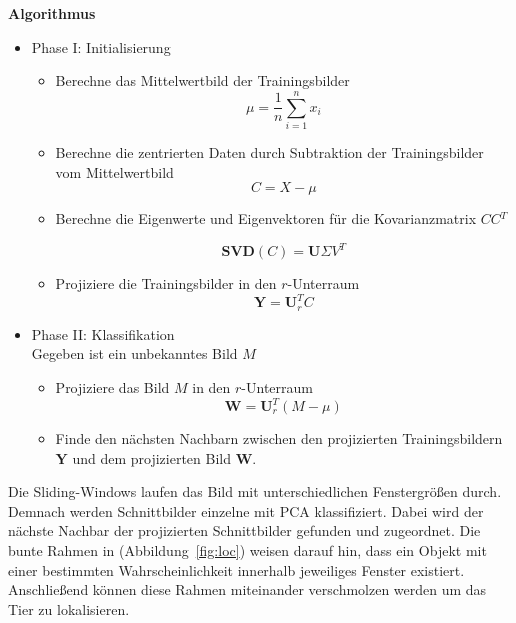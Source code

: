 \textbf{Algorithmus}
\begin{itemize}
\item{Phase I: Initialisierung}
\begin{itemize}
\item{Berechne das Mittelwertbild der Trainingsbilder}
\begin{equation}
\mu = \frac{1}{n}\sum^n_{i=1}{x_i} 
\end{equation}
\item{Berechne die zentrierten Daten durch Subtraktion der Trainingsbilder vom Mittelwertbild}
\begin{equation}
C = X - \mu
\end{equation}
\item{Berechne die Eigenwerte und Eigenvektoren für die Kovarianzmatrix $CC$$^T$}

\begin{equation}
\mathbf{SVD}(C) =\mathbf{U} \Sigma V^T 
\end{equation}
\item{Projiziere die Trainingsbilder in den $r$-Unterraum}
\begin{equation}
\mathbf{Y}=\mathbf{U}^{T}_{r}C
\end{equation}
\end{itemize}
\item{Phase II: Klassifikation}\\
Gegeben ist ein unbekanntes Bild  $M$
\begin{itemize}
\item{Projiziere das Bild $M$ in den $r$-Unterraum}
\begin{equation}
\mathbf{W}=\mathbf{U}^{T}_{r} (M - \mu)
\end{equation}
\item{Finde den nächsten Nachbarn zwischen den projizierten Trainingsbildern $\mathbf{Y}$ und dem projizierten Bild $\mathbf{W}$}.
\end{itemize}
\end{itemize}
Die Sliding-Windows laufen das Bild mit unterschiedlichen Fenstergrößen durch. Demnach werden Schnittbilder einzelne mit PCA klassifiziert. Dabei wird der nächste Nachbar der projizierten Schnittbilder gefunden und zugeordnet. Die bunte Rahmen in (Abbildung~\ref{fig:loc}) weisen darauf hin, dass ein Objekt mit einer bestimmten Wahrscheinlichkeit innerhalb jeweiliges Fenster existiert. Anschließend können diese Rahmen miteinander verschmolzen werden um das Tier zu lokalisieren.
